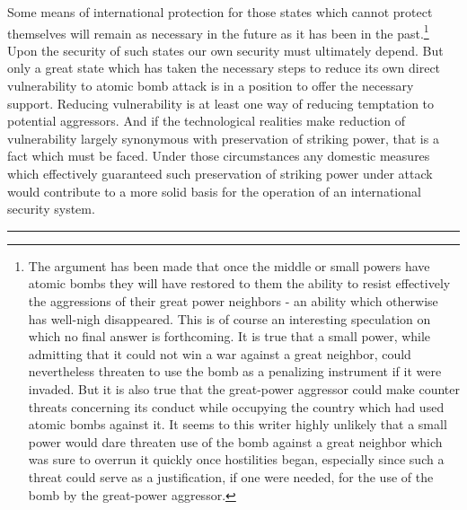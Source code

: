 Some means of international protection for those states which cannot protect themselves will remain as necessary in the future as it has been in the past.\footnote{The argument has been made that once the middle or small powers have atomic bombs they will have restored to them the ability to resist effectively the aggressions of their great power neighbors - an ability which otherwise has well-nigh disappeared. This is of course an interesting speculation on which no final answer is forthcoming. It is true that a small power, while admitting that it could not win a war against a great neighbor, could nevertheless threaten to use the bomb as a penalizing instrument if it were invaded. But it is also true that the great-power aggressor could make counter threats concerning its conduct while occupying the country which had used atomic bombs against it. It seems to this writer highly unlikely that a small power would dare threaten use of the bomb against a great neighbor which was sure to overrun it quickly once hostilities began, especially since such a threat could serve as a justification, if one were needed, for the use of the bomb by the great-power aggressor.} Upon the security of such states our own security must ultimately depend. But only a great state which has taken the necessary steps to reduce its own direct vulnerability to atomic bomb attack is in a position to offer the necessary support. Reducing vulnerability is at least one way of reducing temptation to potential aggressors. And if the technological realities make reduction of vulnerability largely synonymous with preservation of striking power, that is a fact which must be faced. Under those circumstances any domestic measures which effectively guaranteed such preservation of striking power under attack would contribute to a more solid basis for the operation of an international security system.

\noindent\hfil\rule{0.4\textwidth}{.4pt}\hfil

\vspace{4pt}

